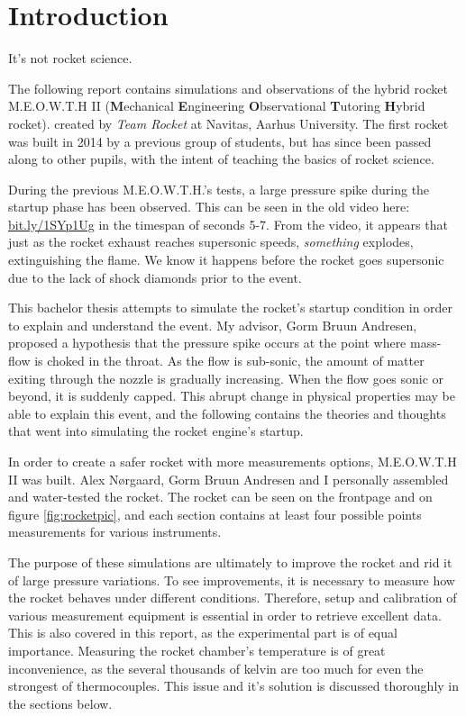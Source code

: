 \chapter{Introduction}

It's not rocket science.

The following report contains simulations and observations of the hybrid rocket M.E.O.W.T.H II (\textbf{M}echanical \textbf{E}ngineering \textbf{O}bservational \textbf{T}utoring \textbf{H}ybrid rocket). created by \emph{Team Rocket} at Navitas, Aarhus University. The first rocket was built in 2014 by a previous group of students, but has since been passed along to other pupils, with the intent of teaching the basics of rocket science. 


During the previous M.E.O.W.T.H.'s tests, a large pressure spike during the startup phase has been observed. This can be seen in the old video here: \url{bit.ly/1SYp1Ug} in the timespan of seconds 5-7. From the video, it appears that just as the rocket exhaust reaches supersonic speeds, \emph{something} explodes, extinguishing the flame. We know it happens before the rocket goes supersonic due to the lack of shock diamonds prior to the event.\cite[chapter 18, p.~643]{rockProp} 


This bachelor thesis attempts to simulate the rocket's startup condition in order to explain and understand the event. My advisor, Gorm Bruun Andresen, proposed a hypothesis that the pressure spike occurs at the point where mass-flow is choked in the throat. As the flow is sub-sonic, the amount of matter exiting through the nozzle is gradually increasing. When the flow goes sonic or beyond, it is suddenly capped. This abrupt change in physical properties may be able to explain this event, and the following contains the theories and thoughts that went into simulating the rocket engine's startup.


In order to create a safer rocket with more measurements options, M.E.O.W.T.H II was built. Alex Nørgaard, Gorm Bruun Andresen and I personally assembled and water-tested the rocket. The rocket can be seen on the frontpage and on figure \ref{fig:rocketpic}, and each section contains at least four possible points measurements for various instruments. 


The purpose of these simulations are ultimately to improve the rocket and rid it of large pressure variations. To see improvements, it is necessary to measure how the rocket behaves under different conditions. Therefore, setup and calibration of various measurement equipment is essential in order to retrieve excellent data. This is also covered in this report, as the experimental part is of equal importance. Measuring the rocket chamber's temperature is of great inconvenience, as the several thousands of kelvin are too much for even the strongest of thermocouples.\cite{thermocoup} This issue and it's solution is discussed thoroughly in the sections below.



